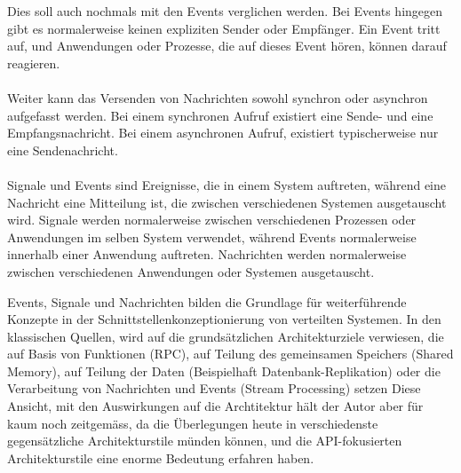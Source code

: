 \documentclass[../vs-script-first-v01.tex]{subfiles}
\begin{document}
Dies soll auch nochmals mit den Events verglichen werden. Bei Events hingegen gibt es normalerweise keinen expliziten Sender oder Empfänger. Ein Event tritt auf, und Anwendungen oder Prozesse, die auf dieses Event hören, können darauf reagieren. 
\\\\
Weiter kann das Versenden von Nachrichten sowohl synchron oder asynchron aufgefasst werden. Bei einem synchronen Aufruf existiert eine Sende- und eine Empfangsnachricht. Bei einem asynchronen Aufruf, existiert  typischerweise nur eine Sendenachricht.
\\\\
Signale und Events sind Ereignisse, die in einem System auftreten, während eine Nachricht eine Mitteilung ist, die zwischen verschiedenen Systemen ausgetauscht wird. Signale werden normalerweise zwischen verschiedenen Prozessen oder Anwendungen im selben System verwendet, während Events normalerweise innerhalb einer Anwendung auftreten. Nachrichten werden normalerweise zwischen verschiedenen Anwendungen oder Systemen ausgetauscht.

Events, Signale und Nachrichten bilden die Grundlage für weiterführende Konzepte in der Schnittstellenkonzeptionierung von verteilten Systemen. In den klassischen Quellen, wird auf die grundsätzlichen Architekturziele verwiesen, die auf Basis von Funktionen (RPC), auf Teilung des gemeinsamen Speichers (Shared Memory), auf Teilung der Daten (Beispielhaft Datenbank-Replikation) oder die Verarbeitung von Nachrichten und Events (Stream Processing)  setzen
Diese Ansicht, mit den Auswirkungen auf die Archtitektur hält der Autor aber für kaum noch zeitgemäss, da die Überlegungen heute in verschiedenste gegensätzliche Architekturstile münden können, und die API-fokusierten Architekturstile eine enorme Bedeutung erfahren haben.  
\end{document}
